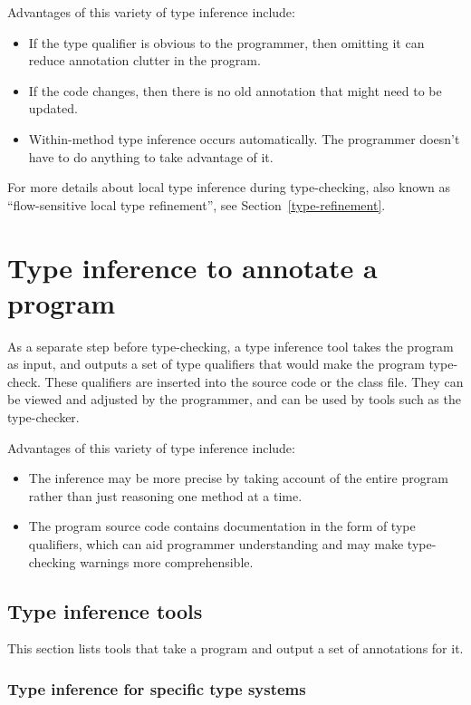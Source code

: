 Advantages of this variety of type inference include:
\begin{itemize}
\item
  If the type qualifier is obvious to the programmer, then omitting it
  can reduce annotation clutter in the program.
\item
  If the code changes, then there is no old annotation that
  might need to be updated.
\item
  Within-method type inference occurs automatically.
  The programmer doesn't have to do anything to take advantage of it.
\end{itemize}

For more details about local type inference during type-checking, also
known as ``flow-sensitive local type refinement'', see
Section~\ref{type-refinement}.


\section{Type inference to annotate a program\label{type-inference-to-annotate}}

As a separate step before type-checking, a type inference tool takes the
program as input, and outputs a set of type qualifiers that would
make the program type-check.
These qualifiers are inserted into the source code or the
class file.  They can be viewed and adjusted by the programmer, and can
be used by tools such as the type-checker.

Advantages of this variety of type inference include:
\begin{itemize}
\item
  The inference may be more precise by taking account of the entire program
  rather than just reasoning one method at a time.
\item
  The program source code contains documentation in the form of type
  qualifiers, which can aid programmer understanding and may make
  type-checking warnings more comprehensible.
\end{itemize}


\subsection{Type inference tools\label{type-inference-tools}}

This section lists tools that take a program and output a set of
annotations for it.


\subsubsection{Type inference for specific type systems\label{type-inference-tools-specialized}}

